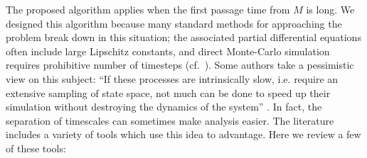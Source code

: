 \documentclass[12pt, nofootinbib,english, amsmath, amssymb, aps, priprint, graphicx,floatfix]{revtex4-1}
\theoremstyle{plain}
\theoremstyle{definition}
\theoremstyle{plain}
\begin{document}
The proposed algorithm applies when the first passage time from $M$ is long.  We designed this algorithm because many standard methods for approaching the problem break down in this situation; the associated partial differential equations often include large Lipschitz constants, and direct Monte-Carlo simulation requires prohibitive number of timesteps (cf.\ \cite{Baum1986-we, Wille1987-tf, Machta2009-gh}).  Some authors take a pessimistic view on this subject: ``If these processes are intrinsically slow, i.e. require an extensive sampling of state space, not much can be done to speed up their simulation without destroying the dynamics of the system'' \cite{Christen2008-ge}.  In fact, the separation of timescales can sometimes make analysis easier.   The literature includes a variety of tools which use this idea to advantage.  Here we review a few of these tools:
\end{document}

